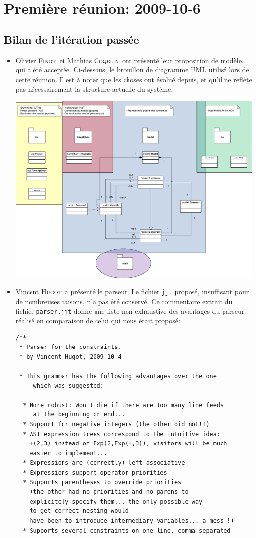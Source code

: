 \documentclass[a4paper,12pt]{article}
\def\familyname{\textsc}
\def\firstname#1{#1}
\def\groupmember#1#2{\firstname{#1} \familyname{#2}}
\def\mmat{\groupmember{Mathias}{Coqblin}}
\def\moli{\groupmember{Olivier}{Finot}}
\def\mvin{\groupmember{Vincent}{Hugot}}
\begin{document}
\section{Première réunion: 2009-10-6}

\subsection{Bilan de l'itération passée}

\begin{itemize}
 \item \moli\ et \mmat\ ont présenté leur proposition de modèle, qui a été acceptée. 
  Ci-dessous, le brouillon
 de diagramme UML utilisé lors de cette réunion. Il est à noter que les choses ont 
 évolué depuis, et qu'il ne reflète pas nécessairement la structure actuelle du système. 

  \includegraphics[scale=0.4]{uml.eps}
\item \mvin\ a présenté le parseur; Le fichier \texttt{jjt} proposé,
  insuffisant pour de nombreuses raisons, n'a pas été conservé. 
  Ce commentaire extrait du fichier \texttt{parser.jjt} donne
  une liste non-exhaustive des avantages du parseur réalisé
  en comparaison de celui qui nous était proposé:
\begin{verbatim}
/** 
 * Parser for the constraints.
 * by Vincent Hugot, 2009-10-4
 
 * This grammar has the following advantages over the one 
     which was suggested:
 
  * More robust: Won't die if there are too many line feeds 
     at the beginning or end...
  * Support for negative integers (the other did not!!)
  * AST expression trees correspond to the intuitive idea:
    +(2,3) instead of Exp(2,Exp(+,3)); visitors will be much
    easier to implement...
  * Expressions are (correctly) left-associative
  * Expressions support operator priorities
  * Supports parentheses to override priorities
    (the other had no priorities and no parens to 
    explicitely specify them... the only possible way 
    to get correct nesting would
    have been to introduce intermediary variables... a mess !)
  * Supports several constraints on one line, comma-separated
     

\end{verbatim}
\end{itemize}
\end{document}
